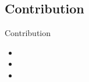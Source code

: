 \subsection{Contribution}
\begin{frame}{Contribution}
    \begin{itemize}
        \item 
        \bigskip
        \item
        \bigskip
        \item
    \end{itemize}
\end{frame}